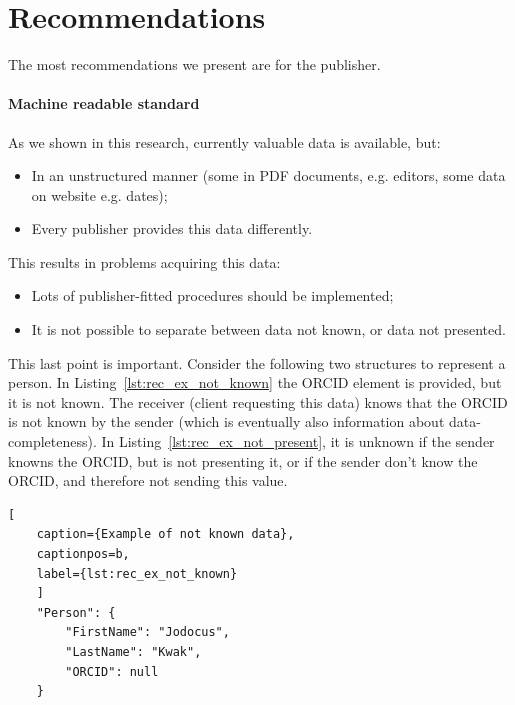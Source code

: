 \documentclass{ou-report}
\begin{document}




\section{Recommendations}
\label{sec:recommendations}


The most recommendations we present are for the publisher.

\paragraph{Machine readable standard}
As we shown in this research, currently valuable data is available, but:
\begin{itemize}
    \item In an unstructured manner (some in PDF documents, e.g. editors, some 
        data on website e.g. dates);
    \item Every publisher provides this data differently.
\end{itemize}
This results in problems acquiring this data:
\begin{itemize}
    \item Lots of publisher-fitted procedures should be implemented;
    \item It is not possible to separate between data not known, or data not 
    presented.
\end{itemize}
This last point is important. Consider the following two structures to represent 
a person. In Listing~\ref{lst:rec_ex_not_known} the ORCID element is 
provided, but it is not known. The receiver (client requesting this data) knows 
that the ORCID is not known by the sender (which is eventually also information 
about data-completeness). In 
Listing~\ref{lst:rec_ex_not_present}, it is unknown if the sender knowns the 
ORCID, but is not presenting it, or if the sender don't know the ORCID, and 
therefore not sending this value.

\begin{lstlisting}[
    caption={Example of not known data},
    captionpos=b,
    label={lst:rec_ex_not_known}
    ]
    "Person": {
        "FirstName": "Jodocus",
        "LastName": "Kwak",
        "ORCID": null
    }
\end{lstlisting}
\end{document}
